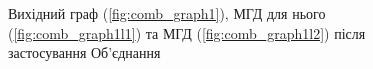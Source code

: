 \begin{figure}[h]
  \centering
  \subfloat[Граф 1]{\label{fig:comb_graph1}
    
  }
  \subfloat[Граф 2]{\label{fig:comb_graph1l1}
    
  }
  \subfloat[Граф 3]{\label{fig:comb_graph1l2}
    
  }
  \caption{Вихідний граф (\ref{fig:comb_graph1}), МГД для нього (\ref{fig:comb_graph1l1}) та МГД (\ref{fig:comb_graph1l2}) після застосування Об'єднання}
  \label{fig:combine_example}
\end{figure}
